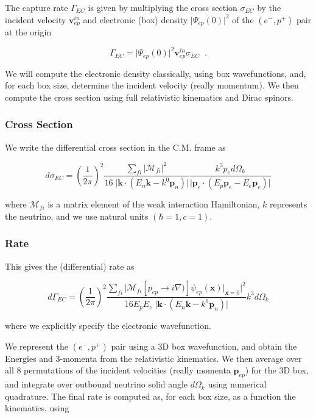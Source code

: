 \documentclass[%
 aip,
 jmp,%
 amsmath,amssymb,
 reprint,%
]{revtex4-1}
\begin{document}
 The capture rate $\Gamma_{EC}$  is given by multiplying the cross section $\sigma_{EC}$ by the incident velocity $\mathbf{v}^{in}_{ep}$ and electronic (box) density $\big\vert\Psi_{ep}(0)\big\vert^{2}$  of the $(e^{-},p^{+})$ pair at the origin

$$\Gamma_{EC}=\big\vert\Psi_{ep}(0)\big\vert^{2}\mathbf{v}^{in}_{ep}\sigma_{EC}\;\;.$$

We will compute the electronic density classically, using box wavefunctions, and, for each box size, determine the incident velocity (really momentum). We then compute the cross section using full relativistic kinematics and Dirac spinors.  

\subsubsection{Cross Section}

We write the differential cross section in the C.M. frame as

$$d\sigma_{EC}=\left(\dfrac{1}{2\pi}\right)^{2}\dfrac{\sum_{fi}\big\vert\mathcal{M}_{fi}\big\vert^{2}}{16\;\big\vert\mathbf{k}\cdot(E{_n}\mathbf{k}-k^{0}\mathbf{p}_{n})\big\vert}\dfrac{k^{3}p_{e}d\Omega_{k}}{\big\vert\mathbf{p}_{e}\cdot(E_{p}\mathbf{p}_{e}-E_{e}\mathbf{p}_{e})\big\vert}$$

where $\mathcal{M}_{fi}$ is a matrix element of the weak interaction Hamiltonian,  $k$ represents the neutrino, and we use natural units $(\hbar=1,c=1)$.


\subsubsection{Rate}

This gives the (differential) rate as

$$d\Gamma_{EC}=\left(\dfrac{1}{2\pi}\right)^{2}\dfrac{\sum_{fi}\big\vert\mathcal{M}_{fi}\left[p_{ep}\rightarrow i\nabla)\right]\psi_{ep}(\mathbf{x})\big\vert_{\mathbf{x}=0}\big\vert^{2}}{16E_{p}E_{e}\;\big\vert\mathbf{k}\cdot(E{_n}\mathbf{k}-k^{0}\mathbf{p}_{n})\big\vert}k^{3}d\Omega_{k}$$

where we explicitly specify the electronic wavefunction.

We represent the $(e^{-},p^{+})$ pair using a 3D box wavefunction, and obtain the Energies and 3-momenta from the relativistic kinematics.  We then average over all 8 permutations of the incident velocities (really momenta $\mathbf{p}_{ep}$) for the 3D box, and integrate over outbound neutrino solid angle $d\Omega_{k}$ using numerical quadrature.  The final rate is computed as, for each box size, as a function the kinematics, using
\end{document}
